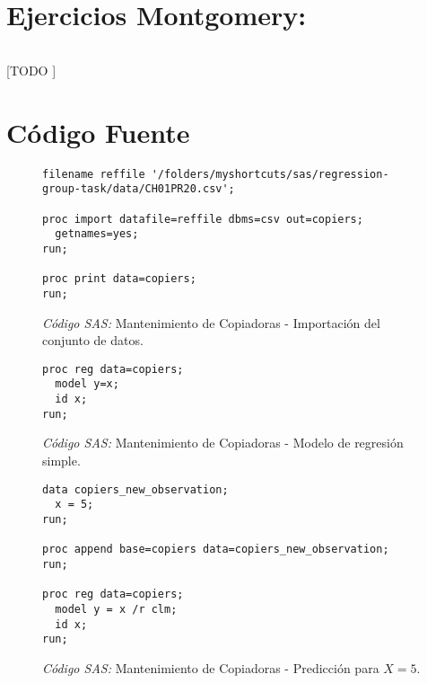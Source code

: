 \documentclass{article}
\begin{document}
  \part{Ejercicios Montgomery:}

    \paragraph{}
    [TODO ]


  \part{Código Fuente}

    \begin{figure}[!h]
      \centering
      \begin{verbatim}
filename reffile '/folders/myshortcuts/sas/regression-group-task/data/CH01PR20.csv';

proc import datafile=reffile dbms=csv out=copiers;
  getnames=yes;
run;

proc print data=copiers;
run;
      \end{verbatim}
      \caption{\emph{Código SAS:} Mantenimiento de Copiadoras - Importación del conjunto de datos.}
      \label{code:sas-copiers-1}
    \end{figure}


    \begin{figure}[!h]
      \centering
      \begin{verbatim}
proc reg data=copiers;
  model y=x;
  id x;
run;
      \end{verbatim}
      \caption{\emph{Código SAS:} Mantenimiento de Copiadoras - Modelo de regresión simple.}
      \label{code:sas-copiers-2}
    \end{figure}

    \begin{figure}[!h]
      \centering
      \begin{verbatim}
data copiers_new_observation;
  x = 5;
run;

proc append base=copiers data=copiers_new_observation;
run;

proc reg data=copiers;
  model y = x /r clm;
  id x;
run;
      \end{verbatim}
      \caption{\emph{Código SAS:} Mantenimiento de Copiadoras - Predicción para $X = 5$.}
      \label{code:sas-copiers-3}
    \end{figure}
\end{document}
